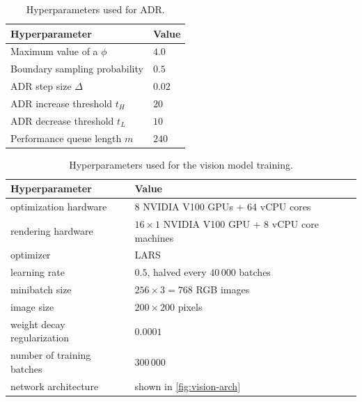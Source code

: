 \begin{table}[h!]
    \footnotesize
    \centering
    \caption{Hyperparameters used for ADR.}
    \renewcommand{\arraystretch}{1.3}
    \begin{tabular}{@{}ll@{}}
        \toprule
        \textbf{Hyperparameter} & \textbf{Value} \\ \midrule
        Maximum value of a $\phi$ & $4.0$ \\
        Boundary sampling probability & $0.5$ \\
        ADR step size $\Delta$ & $0.02$ \\
        ADR increase threshold $t_H$ & $20$ \\
        ADR decrease threshold $t_L$ & $10$ \\
        Performance queue length $m$ & $240$ \\
    \bottomrule\end{tabular}
    \label{tbl:adr-hparams}
\end{table}

\begin{table}[h!]
    \centering
    \footnotesize
    \caption{Hyperparameters used for the vision model training.}
    \renewcommand{\arraystretch}{1.3}
    \begin{tabular}{@{}ll@{}}
        \toprule
        \textbf{Hyperparameter} & \textbf{Value} \\ \midrule
        optimization hardware & 8 NVIDIA V100 GPUs + 64 vCPU cores \\
        rendering hardware & $16 \times 1$ NVIDIA V100 GPU + 8 vCPU core machines \\
        optimizer & LARS~\citep{LARS} \\
        learning rate & $0.5$, halved every $40\,000$ batches \\
        minibatch size &  $256 \times 3 = 768$ RGB images \\
        image size & $200 \times 200$ pixels \\
        weight decay regularization & $0.0001$ \\
        number of training batches & $300\,000$ \\
        network architecture & shown in \autoref{fig:vision-arch} \\
    \bottomrule\end{tabular}
    \label{tbl:vision-hyp}
\end{table}


